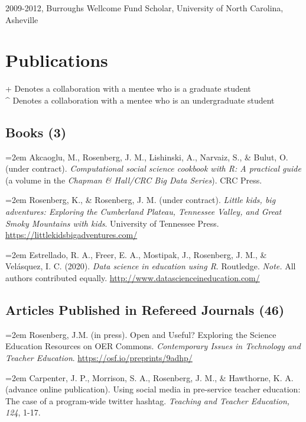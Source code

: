 \documentclass[
  14,
]{article}
\begin{document}
2009-2012, Burroughs Wellcome Fund Scholar, University of North
Carolina, Asheville

\hypertarget{publications}{%
\section{Publications}\label{publications}}

+ Denotes a collaboration with a mentee who is a graduate student\\
\^{} Denotes a collaboration with a mentee who is an undergraduate
student

\hypertarget{books-3}{%
\subsection{Books (3)}\label{books-3}}

\hangindent=2em Akcaoglu, M., Rosenberg, J. M., Lishinski, A., Narvaiz,
S., \& Bulut, O. (under contract). \emph{Computational social science
cookbook with R: A practical guide} (a volume in the \emph{Chapman \&
Hall/CRC Big Data Series}). CRC Press.

\hangindent=2em Rosenberg, K., \& Rosenberg, J. M. (under contract).
\emph{Little kids, big adventures: Exploring the Cumberland Plateau,
Tennessee Valley, and Great Smoky Mountains with kids}. University of
Tennessee Press. \url{https://littlekidsbigadventures.com/}

\hangindent=2em Estrellado, R. A., Freer, E. A., Mostipak, J.,
Rosenberg, J. M., \& Velásquez, I. C. (2020). \emph{Data science in
education using R}. Routledge. \emph{Note.} All authors contributed
equally. \url{http://www.datascienceineducation.com/}

\hypertarget{articles-published-in-refereed-journals-46}{%
\subsection{Articles Published in Refereed Journals
(46)}\label{articles-published-in-refereed-journals-46}}

\hangindent=2em Rosenberg, J.M. (in press). Open and Useful? Exploring
the Science Education Resources on OER Commons. \emph{Contemporary
Issues in Technology and Teacher Education}.
\url{https://osf.io/preprints/9adhp/}

\hangindent=2em Carpenter, J. P., Morrison, S. A., Rosenberg, J. M., \&
Hawthorne, K. A. (advance online publication). Using social media in
pre-service teacher education: The case of a program-wide twitter
hashtag. \emph{Teaching and Teacher Education, 124}, 1-17.
\end{document}

